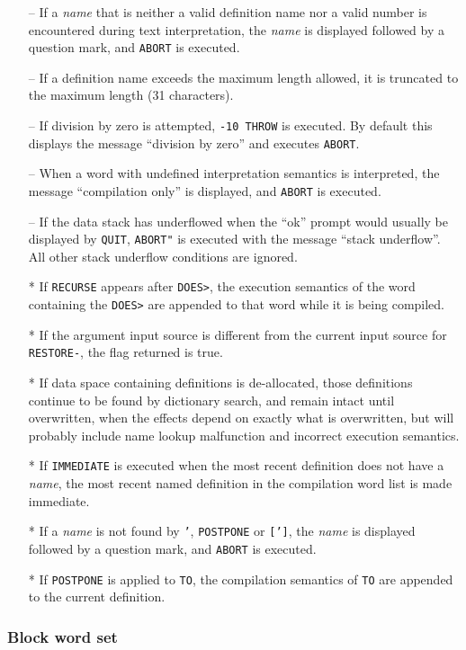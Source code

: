 \documentclass[english]{article}
\begin{document}
\begin{itemize}
\item[--]If a \textit{name} that is neither a valid definition name nor a valid number is encountered during text interpretation, the \textit{name} is displayed followed by a question mark, and {\tt ABORT} is executed.
\item[--]If a definition name exceeds the maximum length allowed, it is truncated to the maximum length (31 characters).
\item[--]If division by zero is attempted, {\tt -10 THROW} is executed. By default this displays the message ``division by zero'' and executes {\tt ABORT}.
\item[--]When a word with undefined interpretation semantics is interpreted, the message ``compilation only'' is displayed, and {\tt ABORT} is executed.
\item[--]If the data stack has underflowed when the ``ok'' prompt would usually be displayed by {\tt QUIT}, {\tt ABORT"} is executed with the message ``stack underflow''. All other stack underflow conditions are ignored.
\item[*]If {\tt RECURSE} appears after {\tt DOES>}, the execution semantics of the word containing the {\tt DOES>} are appended to that word while it is being compiled.
\item[*]If the argument input source is different from the current input source for {\tt RESTORE-}, the flag returned is true.
\item[*]If data space containing definitions is de-allocated, those definitions continue to be found by dictionary search, and remain intact until overwritten, when the effects depend on exactly what is overwritten, but will probably include name lookup malfunction and incorrect execution semantics.
\item[*]If {\tt IMMEDIATE} is executed when the most recent definition does not have a \textit{name}, the most recent named definition in the compilation word list is made immediate.
\item[*]If a \textit{name} is not found by {\tt '}, {\tt POSTPONE} or {\tt [']}, the \textit{name} is displayed followed by a question mark, and {\tt ABORT} is executed.
\item[*]If {\tt POSTPONE} is applied to {\tt TO}, the compilation semantics of {\tt TO} are appended to the current definition.
\end{itemize}

\subsubsection{Block word set}
\end{document}
